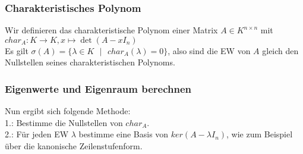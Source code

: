 \documentclass{article}
\begin{document}
\subsubsection*{Charakteristisches Polynom}
Wir definieren das charakteristische Polynom einer Matrix \(A \in K^{n\times n}\) mit\\
\(char_A : K \rightarrow K, x \mapsto \det(A - xI_n)\) \\
Es gilt \(\sigma(A) = \{\lambda \in K \text{ }|\text{ } char_A(\lambda) = 0\}\), also sind die EW von \(A\) gleich den Nullstellen seines charakteristischen Polynoms. \\
\subsubsection*{Eigenwerte und Eigenraum berechnen}
Nun ergibt sich folgende Methode:\\
1.: Bestimme die Nullstellen von \(char_A\). \\
2.: Für jeden EW \(\lambda\) bestimme eine Basis von \(ker(A - \lambda I_n)\), wie zum Beispiel über die kanonische Zeilenstufenform.
\end{document}
